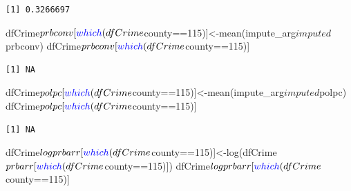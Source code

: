 \documentclass[]{article}
\newenvironment{Shaded}{}{}
\newcommand{\DecValTok}[1]{#1}
\newcommand{\KeywordTok}[1]{\textcolor[rgb]{0.00,0.00,1.00}{#1}}
\newcommand{\NormalTok}[1]{#1}
\newcommand{\OperatorTok}[1]{#1}
\begin{document}
\begin{verbatim}
[1] 0.3266697
\end{verbatim}

\begin{Shaded}
\begin{Highlighting}[]
\NormalTok{dfCrime}\OperatorTok{$}\NormalTok{prbconv[}\KeywordTok{which}\NormalTok{(dfCrime}\OperatorTok{$}\NormalTok{county}\OperatorTok{==}\DecValTok{115}\NormalTok{)]<-}\KeywordTok{mean}\NormalTok{(impute_arg}\OperatorTok{$}\NormalTok{imputed}\OperatorTok{$}\NormalTok{prbconv)}
\NormalTok{dfCrime}\OperatorTok{$}\NormalTok{prbconv[}\KeywordTok{which}\NormalTok{(dfCrime}\OperatorTok{$}\NormalTok{county}\OperatorTok{==}\DecValTok{115}\NormalTok{)]}
\end{Highlighting}
\end{Shaded}

\begin{verbatim}
[1] NA
\end{verbatim}

\begin{Shaded}
\begin{Highlighting}[]
\NormalTok{dfCrime}\OperatorTok{$}\NormalTok{polpc[}\KeywordTok{which}\NormalTok{(dfCrime}\OperatorTok{$}\NormalTok{county}\OperatorTok{==}\DecValTok{115}\NormalTok{)]<-}\KeywordTok{mean}\NormalTok{(impute_arg}\OperatorTok{$}\NormalTok{imputed}\OperatorTok{$}\NormalTok{polpc)}
\NormalTok{dfCrime}\OperatorTok{$}\NormalTok{polpc[}\KeywordTok{which}\NormalTok{(dfCrime}\OperatorTok{$}\NormalTok{county}\OperatorTok{==}\DecValTok{115}\NormalTok{)]}
\end{Highlighting}
\end{Shaded}

\begin{verbatim}
[1] NA
\end{verbatim}

\begin{Shaded}
\begin{Highlighting}[]
\NormalTok{dfCrime}\OperatorTok{$}\NormalTok{logprbarr[}\KeywordTok{which}\NormalTok{(dfCrime}\OperatorTok{$}\NormalTok{county}\OperatorTok{==}\DecValTok{115}\NormalTok{)]<-}\KeywordTok{log}\NormalTok{(dfCrime}\OperatorTok{$}\NormalTok{prbarr[}\KeywordTok{which}\NormalTok{(dfCrime}\OperatorTok{$}\NormalTok{county}\OperatorTok{==}\DecValTok{115}\NormalTok{)])}
\NormalTok{dfCrime}\OperatorTok{$}\NormalTok{logprbarr[}\KeywordTok{which}\NormalTok{(dfCrime}\OperatorTok{$}\NormalTok{county}\OperatorTok{==}\DecValTok{115}\NormalTok{)]}
\end{Highlighting}
\end{Shaded}
\end{document}
